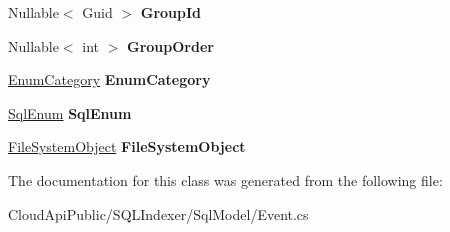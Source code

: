 \begin{DoxyCompactItemize}
\item 
\hypertarget{class_s_q_l_indexer_1_1_sql_model_1_1_event_ae9f6e2467f96a08a05ecb9f8bec00c1a}{Nullable$<$ Guid $>$ {\bfseries Group\-Id}}\label{class_s_q_l_indexer_1_1_sql_model_1_1_event_ae9f6e2467f96a08a05ecb9f8bec00c1a}

\item 
\hypertarget{class_s_q_l_indexer_1_1_sql_model_1_1_event_a5d27d1a5aeb56e2b5dadef0e6ae3553d}{Nullable$<$ int $>$ {\bfseries Group\-Order}}\label{class_s_q_l_indexer_1_1_sql_model_1_1_event_a5d27d1a5aeb56e2b5dadef0e6ae3553d}

\item 
\hypertarget{class_s_q_l_indexer_1_1_sql_model_1_1_event_a8e249ceff883540909d49b067bf7b97f}{\hyperlink{class_s_q_l_indexer_1_1_sql_model_1_1_enum_category}{Enum\-Category} {\bfseries Enum\-Category}}\label{class_s_q_l_indexer_1_1_sql_model_1_1_event_a8e249ceff883540909d49b067bf7b97f}

\item 
\hypertarget{class_s_q_l_indexer_1_1_sql_model_1_1_event_a4a309d6429d4bc9d2443c5c2ef728a03}{\hyperlink{class_s_q_l_indexer_1_1_sql_model_1_1_sql_enum}{Sql\-Enum} {\bfseries Sql\-Enum}}\label{class_s_q_l_indexer_1_1_sql_model_1_1_event_a4a309d6429d4bc9d2443c5c2ef728a03}

\item 
\hypertarget{class_s_q_l_indexer_1_1_sql_model_1_1_event_af118e8d85778286142d62da717b662b3}{\hyperlink{class_s_q_l_indexer_1_1_sql_model_1_1_file_system_object}{File\-System\-Object} {\bfseries File\-System\-Object}}\label{class_s_q_l_indexer_1_1_sql_model_1_1_event_af118e8d85778286142d62da717b662b3}

\end{DoxyCompactItemize}


The documentation for this class was generated from the following file\-:\begin{DoxyCompactItemize}
\item 
Cloud\-Api\-Public/\-S\-Q\-L\-Indexer/\-Sql\-Model/Event.\-cs\end{DoxyCompactItemize}
